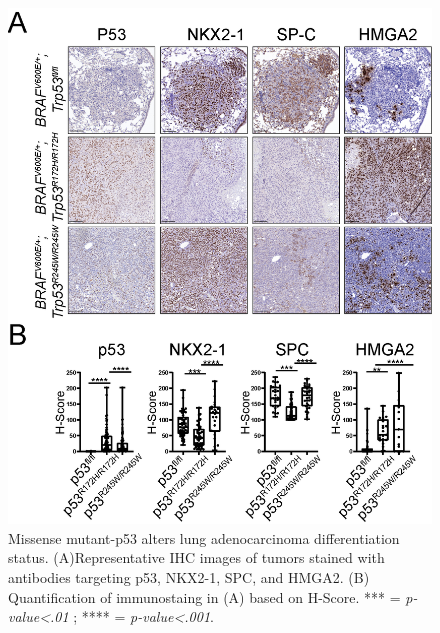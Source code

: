 \begin{figure}
\hypertarget{fig:3.5}{%
\centering
\includegraphics[width=1\textwidth,height=\textheight]{images/p53_4.png}
\caption{Missense mutant-p53 alters lung adenocarcinoma differentiation status. (A)Representative IHC images of tumors stained with antibodies targeting p53, NKX2-1, SPC, and HMGA2. (B) Quantification of immunostaing in (A) based on H-Score. *** = \emph{p-value\textless.01} ; **** = \emph{p-value\textless.001}.}\label{fig:3.5}
}
\end{figure}

